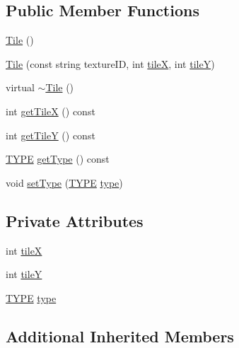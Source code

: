 \subsection*{Public Member Functions}
\begin{DoxyCompactItemize}
\item 
\hyperlink{class_tile_aeeb5593bb6b75aae2edfcccbc84ab378}{Tile} ()
\item 
\hyperlink{class_tile_a21f16fb59b8fe5c47b0a0b070673786e}{Tile} (const string texture\+I\+D, int \hyperlink{class_tile_ac3f88f7a9c6ec1d0c9640ebb9a6ae73a}{tile\+X}, int \hyperlink{class_tile_a3fbe8c6bce65bc408ae0d028e43f4672}{tile\+Y})
\item 
virtual \hyperlink{class_tile_a98634abbd93fa13d0578d7103202d03d}{$\sim$\+Tile} ()
\item 
int \hyperlink{class_tile_ac292026c5bfa9181f221bf8a7844ee89}{get\+Tile\+X} () const 
\item 
int \hyperlink{class_tile_aecb8774e1eadb370cc0e350cec68e472}{get\+Tile\+Y} () const 
\item 
\hyperlink{class_tile_acb53d82f9dacff45a98acc63276928eb}{T\+Y\+P\+E} \hyperlink{class_tile_accf61745cef281d948e7acc7260c8b86}{get\+Type} () const 
\item 
void \hyperlink{class_tile_a836374a59b2dd3df9337d572cb5b092d}{set\+Type} (\hyperlink{class_tile_acb53d82f9dacff45a98acc63276928eb}{T\+Y\+P\+E} \hyperlink{class_tile_aa14fdeba327537c1e3250be58b63fc50}{type})
\end{DoxyCompactItemize}
\subsection*{Private Attributes}
\begin{DoxyCompactItemize}
\item 
int \hyperlink{class_tile_ac3f88f7a9c6ec1d0c9640ebb9a6ae73a}{tile\+X}
\item 
int \hyperlink{class_tile_a3fbe8c6bce65bc408ae0d028e43f4672}{tile\+Y}
\item 
\hyperlink{class_tile_acb53d82f9dacff45a98acc63276928eb}{T\+Y\+P\+E} \hyperlink{class_tile_aa14fdeba327537c1e3250be58b63fc50}{type}
\end{DoxyCompactItemize}
\subsection*{Additional Inherited Members}


